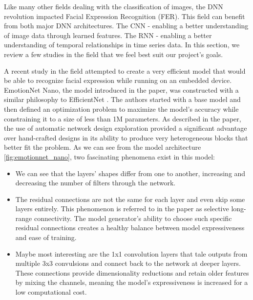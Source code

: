 \documentclass[../main.tex]{subfiles}
\begin{document}
Like many other fields dealing with the classification of images, the DNN revolution impacted Facial Expression Recognition (FER).
This field can benefit from both major DNN architectures. The CNN - enabling a better understanding of image data through learned features.
The RNN - enabling a better understanding of temporal relationships in time series data.
In this section, we review a few studies in the field that we feel best suit our project's goals.
\par

A recent study in the field \cite{emotionnet-nano} attempted to create a very efficient model that would be able
to recognize facial expression while running on an embedded device.  EmotionNet Nano, the model introduced in the paper,
was constructed with a similar philosophy to EfficientNet \cite{effnet}. The authors started with a base model and then defined an
optimization problem to maximize the model's accuracy while constraining it to a size of less than 1M parameters.
As described in the paper, the use of automatic network design exploration provided a significant advantage over hand-crafted
designs in its ability to produce very heterogeneous blocks that better fit the problem.
As we can see from the model architecture \ref{fig:emotionnet_nano}, two fascinating phenomena exist in this model:

 
\begin{itemize}
    \item We can see that the layers' shapes differ from one to another, increasing and decreasing the number of filters through the network.
    \item The residual connections are not the same for each layer and even skip some layers entirely.
        This phenomenon is referred to in the paper as selective long-range connectivity. The model generator's ability to choose such
        specific residual connections creates a healthy balance between model expressiveness and ease of training.
    \item Maybe most interesting are the 1x1 convolution layers that tale outputs from multiple 3x3 convulsions
        and connect back to the network at deeper layers. These connections provide dimensionality reductions and retain older
        features by mixing the channels, meaning the model's expressiveness is increased for a low computational cost.
\end{itemize}
 
\end{document}

